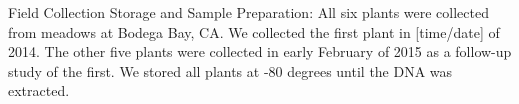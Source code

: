 
Field Collection Storage and Sample Preparation:
All six plants were collected from meadows at Bodega Bay, CA. We collected the first plant in [time/date] of 2014. The other five plants were collected in early February of 2015 as a follow-up study of the first. We stored all plants at -80 degrees until the DNA was extracted. 
    
